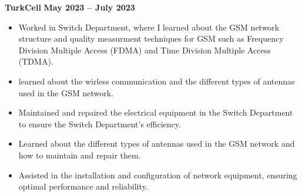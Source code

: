 \documentclass[10pt,a4paper]{article}
\begin{document}
\textbf{TurkCell} \hfill \textbf{May 2023 -- July 2023} \\

\vspace{-8mm}
\begin{itemize}[leftmargin=*]
    \item Worked in Switch Department, where I learned about the GSM network structure and quality measurment techniques for GSM such as Frequency Division Multiple Access (FDMA) and Time Division Multiple Access (TDMA).
    \item learned about the wirless communication and the different types of antennas used in the GSM network.
    \item Maintained and repaired the electrical equipment in the Switch Department to ensure the Switch Department's efficiency.
    \item Learned about the different types of antennas used in the GSM network and how to maintain and repair them.
    \item Assisted in the installation and configuration of network equipment, ensuring optimal performance and reliability.
    \vspace{-2mm}
\end{itemize}
\vspace{-2mm}
\end{document}
